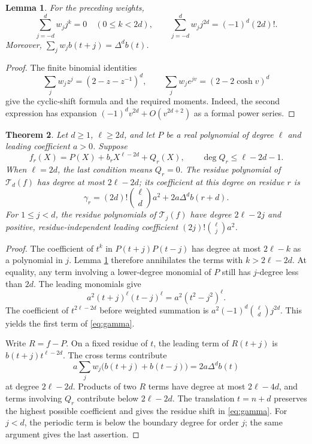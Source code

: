 \documentclass[11pt,reqno]{amsart}
\newtheorem{theorem}{Theorem}[section]
\newtheorem{lemma}[theorem]{Lemma}
\theoremstyle{remark}
\newcommand{\Lag}{\mathcal{T}}
\newcommand{\Dlt}{\Delta}
\begin{document}
\begin{lemma}\label{lem:moment}
For the preceding weights,
\[
 \sum_{j=-d}^{d}w_jj^k=0\quad(0\le k<2d),
 \qquad
 \sum_{j=-d}^{d}w_jj^{2d}=(-1)^d(2d)!.
\]
Moreover, \(\sum_jw_jb(t+j)=\Dlt^db(t)\).
\end{lemma}
\begin{proof}
The finite binomial identities
\[
 \sum_j w_jz^j=(2-z-z^{-1})^d,\qquad
 \sum_jw_je^{jv}=(2-2\cosh v)^d
\]
give the cyclic-shift formula and the required moments. Indeed, the second
expression has expansion \((-1)^dv^{2d}+O(v^{2d+2})\) as a formal power series.
\end{proof}

\begin{theorem}\label{thm:boundary}
Let \(d\ge1\), \(\ell\ge2d\), and let \(P\) be a real polynomial of degree
\(\ell\) and leading coefficient \(a>0\). Suppose
\[
 f_r(X)=P(X)+b_rX^{\ell-2d}+Q_r(X),\qquad
 \deg Q_r\le\ell-2d-1.
\]
When \(\ell=2d\), the last condition means \(Q_r=0\).
The residue polynomial of \(\Lag_d(f)\) has degree at most \(2\ell-2d\);
its coefficient at this degree on residue \(r\) is
\begin{equation}\label{eq:gamma}
 \gamma_r=(2d)!\binom{\ell}{d}a^2+2a\Dlt^db(r+d).
\end{equation}
For \(1\le j<d\), the residue polynomials of \(\Lag_j(f)\) have degree
\(2\ell-2j\) and positive, residue-independent leading coefficient
\((2j)!\binom{\ell}{j}a^2\).
\end{theorem}
\begin{proof}
The coefficient of \(t^k\) in \(P(t+j)P(t-j)\) has degree at most
\(2\ell-k\) as a polynomial in \(j\). Lemma \ref{lem:moment} therefore
annihilates the terms with \(k>2\ell-2d\). At equality, any term involving
a lower-degree monomial of \(P\) still has \(j\)-degree less than \(2d\).
The leading monomials give
\[
 a^2(t+j)^\ell(t-j)^\ell=a^2(t^2-j^2)^\ell.
\]
The coefficient of \(t^{2\ell-2d}\) before weighted summation is
\(a^2(-1)^d\binom{\ell}{d}j^{2d}\). This yields the first term of
\eqref{eq:gamma}.

Write \(R=f-P\). On a fixed residue of \(t\), the leading term of
\(R(t+j)\) is \(b(t+j)t^{\ell-2d}\). The cross terms contribute
\[
 a\sum_jw_j\bigl(b(t+j)+b(t-j)\bigr)=2a\Dlt^db(t)
\]
at degree \(2\ell-2d\). Products of two \(R\) terms have degree at most
\(2\ell-4d\), and terms involving \(Q_r\) contribute below \(2\ell-2d\).
The translation \(t=n+d\) preserves the highest possible coefficient and
gives the residue shift in \eqref{eq:gamma}.
For \(j<d\), the periodic term is below the boundary degree for order \(j\);
the same argument gives the last assertion.
\end{proof}
\end{document}
